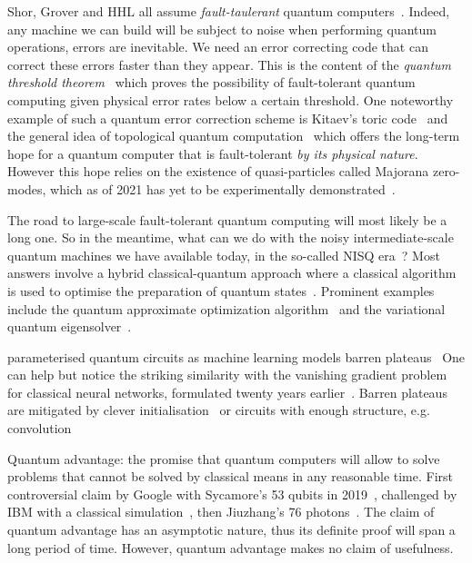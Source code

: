 Shor, Grover and HHL all assume \emph{fault-taulerant}
quantum computers~\cite{Shor96}.
Indeed, any machine we can build will be subject to noise when performing
quantum operations, errors are inevitable.
We need an error correcting code
that can correct these errors faster than they appear.
This is the content of the \emph{quantum threshold theorem}~\cite{AharonovBen-Or08}
which proves the possibility of fault-tolerant quantum computing
given physical error rates below a certain threshold.
One noteworthy example of such a quantum error correction scheme is Kitaev's
toric code~\cite{Kitaev03} and the general idea of topological quantum
computation~\cite{FreedmanEtAl03} which offers the long-term hope for a
quantum computer that is fault-tolerant \emph{by its physical nature}.
However this hope relies on the existence of quasi-particles called Majorana
zero-modes, which as of 2021 has yet to be experimentally demonstrated~\cite{Ball21}.

The road to large-scale fault-tolerant quantum computing will most likely be
a long one.
So in the meantime, what can we do with the noisy intermediate-scale quantum
machines we have available today, in the so-called NISQ era~\cite{Preskill18}?
Most answers involve a hybrid classical-quantum approach where a classical
algorithm is used to optimise the preparation of quantum states~\cite{McCleanEtAl16}.
Prominent examples include the quantum approximate optimization algorithm~\cite{FarhiEtAl14}
and the variational quantum eigensolver~\cite{PeruzzoEtAl14}.

parameterised quantum circuits as machine learning models \cite{BenedettiEtAl19}
barren plateaus~\cite{McCleanEtAl18}
One can help but notice the striking similarity with the vanishing gradient
problem for classical neural networks, formulated twenty years earlier~\cite{Hochreiter98}.
Barren plateaus are mitigated by clever initialisation~\cite{GrantEtAl19} or circuits with enough structure, e.g. convolution~\cite{PesahEtAl21}

Quantum advantage: the promise that quantum
computers will allow to solve problems that cannot be solved by
classical means in any reasonable time. First controversial claim by
Google with Sycamore's 53 qubits in 2019~\cite{AruteEtAl19},
challenged by IBM with a classical simulation~\cite{PednaultEtAl19},
then Jiuzhang's 76 photons~\cite{ZhongEtAl20a}.
The claim of quantum advantage has an asymptotic nature, thus
its definite proof will span a long period of time. However, quantum
advantage makes no claim of usefulness.

